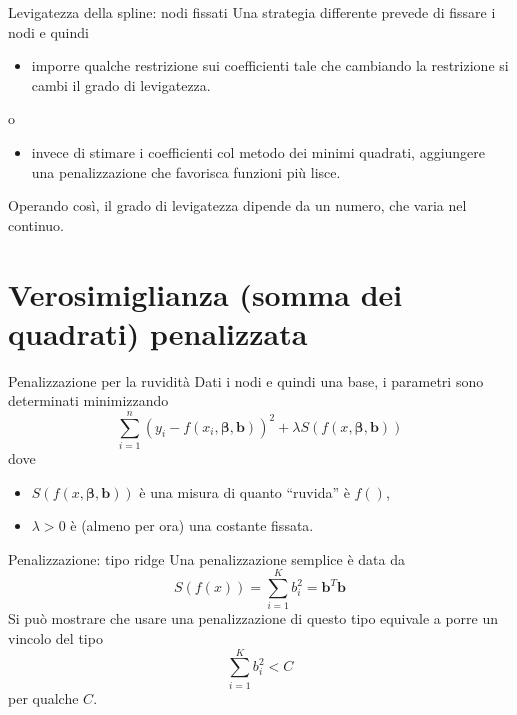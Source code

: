 \documentclass{beamer}\usepackage[]{graphicx}\usepackage[]{color}
\newcommand{\spazio}{\noindent\makebox[\linewidth]{\resizebox{0.1\linewidth}{1pt}{{$\bullet$}}}}
\newcommand{\vbeta}{\bm{\beta}}
\newcommand{\vb}{\bm{b}}
\begin{document}
\begin{frame}{Levigatezza della spline: nodi fissati}
Una strategia differente prevede di fissare i nodi e quindi
\begin{itemize}
\item[] imporre qualche restrizione sui coefficienti tale che cambiando la restrizione si cambi il grado di levigatezza.
\end{itemize}
o
\begin{itemize}
\item[] invece di stimare i coefficienti col metodo dei minimi quadrati, aggiungere una penalizzazione che favorisca funzioni pi\`u lisce.
\end{itemize}
Operando cos\`i, il grado di levigatezza dipende da un numero, che varia nel continuo.



\end{frame}




\section[Penalizzazione]{Verosimiglianza (somma dei quadrati) penalizzata}

\begin{frame}{Penalizzazione per la ruvidit\`a}
Dati i nodi e quindi una base, i parametri sono determinati minimizzando
\[ \sum_{i=1}^n (y_i-f(x_i,\vbeta,\vb))^2 + \lambda S(f(x,\vbeta,\vb)) \]
dove 
\begin{itemize}
\item $S(f(x,\vbeta,\vb))$ \`e una misura di quanto ``ruvida'' \`e $f()$, 
\item $\lambda>0$ \`e (almeno per ora) una costante fissata.
\end{itemize}
\end{frame}


\begin{frame}{Penalizzazione: tipo ridge}
Una penalizzazione semplice \`e data da
\[ S(f(x)) = \sum_{i=1}^K b_i^2 = \vb^T\vb \]
Si pu\`o mostrare che usare una penalizzazione di questo tipo equivale a porre un vincolo del tipo
\[ \sum_{i=1}^Kb_i^2<C \]
per qualche $C$.
\end{frame}
\end{document}
